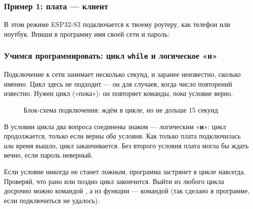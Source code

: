 \subsubsection{Пример 1: плата --- клиент}

В этом режиме ESP32-S3 подключается к твоему роутеру, как телефон или ноутбук. Впиши в программу имя
своей сети и пароль:


\subsubsection{Учимся программировать: цикл \texttt{while} и логическое «и»}

Подключение к сети занимает несколько секунд, и заранее неизвестно, сколько именно. Цикл  здесь
не подходит --- он для случаев, когда число повторений известно. Нужен цикл  («пока»): он
повторяет команды, \emph{пока} условие верно.

\begin{figure}[H]
\centering
{}
\caption{Блок-схема подключения: ждём в цикле, но не дольше 15 секунд}
\end{figure}

В условии цикла два вопроса соединены знаком \code{\&\&} --- логическим «\textbf{и}»: цикл продолжается, только
если верны \emph{оба} условия. Как только плата подключилась \emph{или} время вышло, цикл заканчивается.
Без второго условия плата могла бы ждать вечно, если пароль неверный.

\begin{caution}
Если условие  никогда не станет ложным, программа застрянет в цикле навсегда. Проверяй, что
рано или поздно цикл закончится. Выйти из любого цикла досрочно можно командой , а из
функции --- командой  (так сделано в программе, если подключиться не удалось).
\end{caution}

